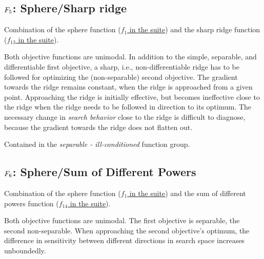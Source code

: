 \subsection[\texorpdfstring{\protect\(F_5\protect\): Sphere/Sharp ridge}{F5: Sphere/Sharp ridge}]{\texorpdfstring{\protect\(F_5\protect\): Sphere/Sharp ridge}{}}
\label{index:sphere-sharp-ridge}\label{index:f5}
Combination of the sphere function (\href{https://coco.gforge.inria.fr/downloads/download16.00/bbobdocfunctions.pdf\#page=5}{\(f_1\) in the \bbob suite})
and the sharp ridge function (\href{https://coco.gforge.inria.fr/downloads/download16.00/bbobdocfunctions.pdf\#page=65}{\(f_{13}\) in the \bbob suite}).

Both objective functions are unimodal.
In addition to the simple, separable, and differentiable first
objective, a sharp, i.e., non-differentiable ridge has to be
followed for optimizing the (non-separable) second objective. The
gradient towards the ridge remains constant, when the ridge is
approached from a given point.
Approaching the ridge is initially effective, but becomes ineffective
close to the ridge when the ridge needs to be followed in direction
to its optimum.  The necessary change in \emph{search behavior} close to
the ridge is difficult to diagnose, because the gradient
towards the ridge does not flatten out.

Contained in the \emph{separable - ill-conditioned} function group.



\subsection[\texorpdfstring{\protect\(F_6\protect\): Sphere/Sum of Different Powers}{F6: Sphere/Sum of Different Powers}]{\texorpdfstring{\protect\(F_6\protect\): Sphere/Sum of Different Powers}{}}
\label{index:sphere-sum-of-different-powers}\label{index:f6}
Combination of the sphere function (\href{https://coco.gforge.inria.fr/downloads/download16.00/bbobdocfunctions.pdf\#page=5}{\(f_1\) in the \bbob suite})
and the sum of different powers function (\href{https://coco.gforge.inria.fr/downloads/download16.00/bbobdocfunctions.pdf\#page=70}{\(f_{14}\) in the \bbob suite}).

Both objective functions are unimodal. The first objective is
separable, the second non-separable.
When approaching the second objective's optimum, the difference
in sensitivity between different directions in search space
increases unboundedly.

